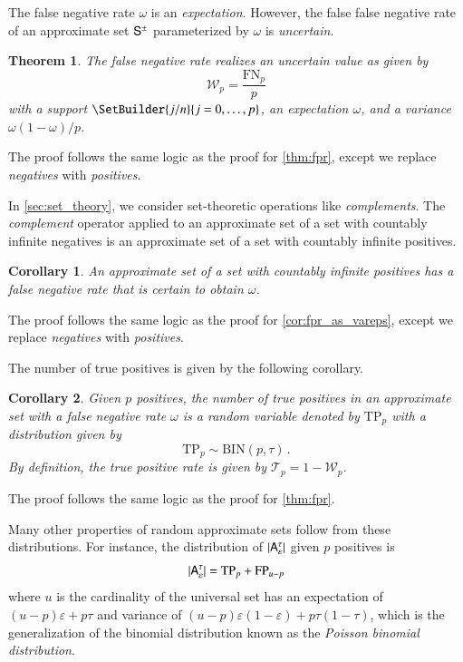 \documentclass[10pt,final,hidelinks]{article}
\numberwithin{equation}{section}
\DeclarePairedDelimiter\Card{\lvert}{\rvert}
\newcommand{\FNR}{\mathcal{W}}
\newcommand{\TPR}{\mathcal{T}}
\newcommand{\TP}{\RV{TP}}
\newcommand{\FP}{\RV{FP}}
\newcommand{\FN}{\RV{FN}}
\newcommand{\tprate}{\tau}
\newcommand{\fprate}{\varepsilon}
\newcommand{\fnrate}{\omega}
\newcommand{\RV}[1]{\mathrm{#1}}
\newcommand{\bindist}{\mathrm{BIN}}
\newcommand{\envnumstyle}{chapter}
\renewcommand{\envnumstyle}{chapter}
\renewcommand{\envnumstyle}{section}
\theoremstyle{plain}
\newtheorem{theorem}{Theorem}[\envnumstyle]
\newtheorem{corollary}{Corollary}[theorem]
\begin{document}
The false negative rate $\fnrate$ is an \emph{expectation}.
However, the false false negative rate of an approximate set $\ASet{S}$ parameterized by $\fnrate$ is \emph{uncertain}.
\begin{theorem}
\label{thm:fnr}
The false negative rate realizes an uncertain value as given by
\begin{equation}
    \FNR_p = \frac{\FN_p}{p}
\end{equation}
with a support $\SetBuilder{j / n}{j = 0,\ldots,p}$, an expectation 
$\fnrate$, 
and a variance $\fnrate(1-\fnrate) / p$.
\end{theorem}
The proof follows the same logic as the proof for \cref{thm:fpr}, except we 
replace \emph{negatives} with \emph{positives}.

In \cref{sec:set_theory}, we consider set-theoretic operations like 
\emph{complements}. The \emph{complement} operator applied to an approximate 
set 
of a set with countably infinite negatives is an approximate set of a set with 
countably infinite positives.
\begin{corollary}
An approximate set of a set with countably infinite positives has a false 
negative rate that is \emph{certain} to obtain $\fnrate$.
\end{corollary}
The proof follows the same logic as the proof for \cref{cor:fpr_as_vareps}, 
except we replace \emph{negatives} with \emph{positives}.

The number of true positives is given by the following corollary.
\begin{corollary}
\label{cor:tpbinom}
Given $p$ positives, the number of \emph{true positives} in an approximate set 
with a false negative rate $\fnrate$ is a random variable denoted by $\TP_p$
with a distribution given by 
\begin{equation}
    \TP_p \sim \bindist(p, \tprate)\,.
\end{equation}
By definition, the \emph{true positive rate} is given by $\TPR_p = 1 - 
\FNR_p$.
\end{corollary}
The proof follows the same logic as the proof for \cref{thm:fpr}.

Many other properties of random approximate sets follow from these distributions.
For instance, the distribution of $\Card{\ASet{A}[\fprate][\tprate]}$ given $p$ positives is
\begin{equation}
	\Card{\ASet{A}[\fprate][\tprate]} = \TP_p + \FP_{u - p}
\end{equation}
where $u$ is the cardinality of the universal set has an expectation of $(u - p) \fprate + p \tprate$ and variance of $(u - p) \fprate(1-\fprate) + p \tprate(1-\tprate)$, which is the generalization of the binomial distribution known as the \emph{Poisson binomial distribution}.
\end{document}
